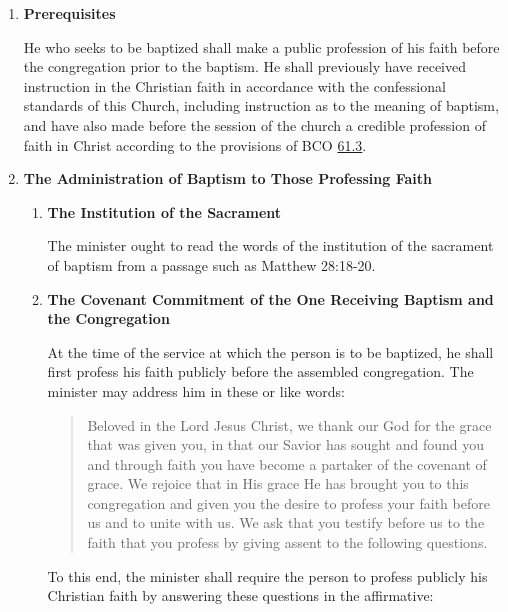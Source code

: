 \documentclass[
]{book}
\begin{document}
\begin{enumerate}
\def\labelenumi{\arabic{enumi}.}
\item
  \protect\hypertarget{59}{\href{}{}}\textbf{Prerequisites}

  He who seeks to be baptized shall make a public profession of his faith before the congregation prior to the baptism. He shall previously have received instruction in the Christian faith in accordance with the confessional standards of this Church, including instruction as to the meaning of baptism, and have also made before the session of the church a credible profession of faith in Christ according to the provisions of BCO \protect\hyperlink{61.3}{61.3}.
\item
  \textbf{The Administration of Baptism to Those Professing Faith}

  \begin{enumerate}
  \def\labelenumii{\alph{enumii}.}
  \item
    \textbf{The Institution of the Sacrament}

    The minister ought to read the words of the institution of the sacrament of baptism from a passage such as Matthew 28:18-20.
  \item
    \textbf{The Covenant Commitment of the One Receiving Baptism and the Congregation}

    At the time of the service at which the person is to be baptized, he shall first profess his faith publicly before the assembled congregation. The minister may address him in these or like words:

    \begin{quote}
    Beloved in the Lord Jesus Christ, we thank our God for the grace that was given you, in that our Savior has sought and found you and through faith you have become a partaker of the covenant of grace. We rejoice that in His grace He has brought you to this congregation and given you the desire to profess your faith before us and to unite with us. We ask that you testify before us to the faith that you profess by giving assent to the following questions.
    \end{quote}

    To this end, the minister shall require the person to profess publicly his Christian faith by answering these questions in the affirmative:


\end{enumerate}
\end{enumerate}
\end{document}

